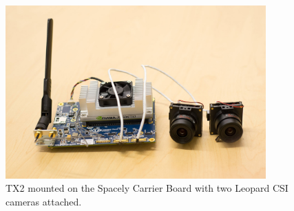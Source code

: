 \documentclass[letterpaper,10pt,serif,draftclsnofoot,onecolumn,compsoc,titlepage]{IEEEtran}
\begin{document}
\begin{figure}[H]
	\centering
	\label{fig:TX2 mounted on the Spacely Carrier Board with two CSI cameras attached.}
	\includegraphics[width=10cm]{images/spacely.eps}
	\caption{TX2 mounted on the Spacely Carrier Board with two Leopard CSI cameras attached. \label{overflow}}
\end{figure}

\nocite{*}
\newpage


\end{document}
